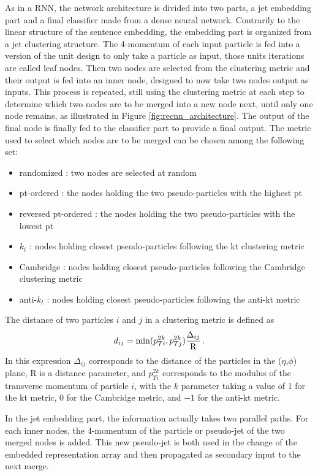 As in a RNN, the network architecture is divided into two parts, a jet embedding part and a final classifier made from a dense neural network. Contrarily to the linear structure of the sentence embedding, the embedding part is organized from a jet clustering structure. The 4-momentum of each input particle is fed into a version of the unit design to only take a particle as input, those units iterations are called leaf nodes. Then two nodes are selected from the clustering metric and their output is fed into an inner node, designed to now take two nodes output as inputs. This process is repeated, still using the clustering metric at each step to determine which two nodes are to be merged into a new node next, until only one node remains, as illustrated in Figure \ref{fig:recnn_architecture}. The output of the final node is finally fed to the classifier part to provide a final output. 
The metric used to select which nodes are to be merged can be chosen among the following set:
    
\begin{itemize}
    \item randomized : two nodes are selected at random
    \item pt-ordered : the nodes holding the two pseudo-particles with the highest pt 
    \item reversed pt-ordered : the nodes holding the two pseudo-particles with the lowest pt
    \item $k_t$ : nodes holding closest pseudo-particles following the kt clustering metric
    \item Cambridge : nodes holding closest pseudo-particles following the Cambridge clustering metric
    \item anti-$k_t$ : nodes holding closest pseudo-particles following the anti-kt metric
\end{itemize}
The distance of two particles $i$ and $j$ in a clustering metric is defined as
\begin{equation}
    d_{ij} = \mathrm{min}(p_{Ti}^{2k},p_{Tj}^{2k}) \frac{\Delta_{ij}}{\mathrm{R}} \mend
\end{equation}
In this expression $\Delta_{ij}$ corresponds to the distance of the particles in the ($\eta$,$\phi$) plane, R is a distance parameter, and $p_{Ti}^{2k}$ corresponds to the modulus of the transverse momentum of particle $i$, with the $k$ parameter taking a value of 1 for the kt metric, 0 for the Cambridge metric, and $-1$ for the anti-kt metric.

In the jet embedding part, the information actually takes two parallel paths. For each inner nodes, the 4-momentum of the particle or pseudo-jet of the two merged nodes is added. This new pseudo-jet is both used in the change of the embedded representation array and then propagated as secondary input to the next merge.


